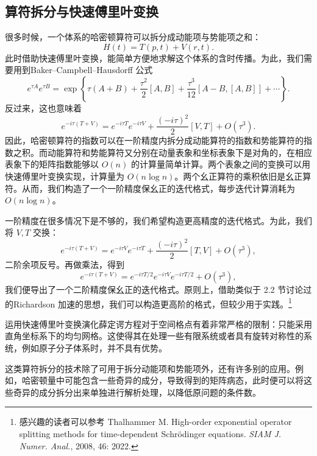 \subsection{算符拆分与快速傅里叶变换}

很多时候，一个体系的哈密顿算符可以拆分成动能项与势能项之和：
\begin{equation}
 H(t)=T(p,t)+V(r,t).
\tag{6.2.20}
\end{equation}
此时借助快速傅里叶变换，能简单方便地求解这个体系的含时传播。为此，我们需要用到Baker--Campbell--Hausdorff 公式
\begin{equation}
 e^{\tau A}e^{\tau B}=\exp\left\{\tau(A+B)+\frac{\tau^2}{2}[A,B]+\frac{\tau^3}{12}[A-B,[A,B]]+\cdots\right\}.
\tag{6.2.21}
\end{equation}
反过来，这也意味着
\begin{equation}
 e^{-i\tau(T+V)}=e^{-i\tau T}e^{-i\tau V}+\frac{(-i\tau)^2}{2}[V,T]+O(\tau^3).
\tag{6.2.22}
\end{equation}
因此，哈密顿算符的指数可以在一阶精度内拆分成动能算符的指数和势能算符的指数之积。而动能算符和势能算符又分别在动量表象和坐标表象下是对角的，在相应表象下的矩阵指数能够以 $O(n)$ 的计算量简单计算。两个表象之间的变换可以用快速傅里叶变换实现，计算量为 $O(n\log n)$。两个幺正算符的乘积依旧是幺正算符。从而，我们构造了一个一阶精度保幺正的迭代格式，每步迭代计算消耗为 $O(n\log n)$。

一阶精度在很多情况下是不够的，我们希望构造更高精度的迭代格式。为此，我们将 $V,T$ 交换：
\begin{equation}
 e^{-i\tau(T+V)}=e^{-i\tau V}e^{-i\tau T}+\frac{(-i\tau)^2}{2}[T,V]+O(\tau^3),
\tag{6.2.23}
\end{equation}
二阶余项反号。再做乘法，得到
\begin{equation}
 e^{-i\tau(T+V)}=e^{-i\tau T/2}e^{-i\tau V}e^{-i\tau T/2}+O(\tau^3),
\tag{6.2.24}
\end{equation}
我们便导出了一个二阶精度保幺正的迭代格式。原则上，借助类似于 2.2 节讨论过的Richardson 加速的思想，我们可以构造更高阶的格式，但较少用于实践。\footnote{感兴趣的读者可以参考 Thalhammer M. High-order exponential operator splitting methods for time-dependent Schrödinger equations. \emph{SIAM J. Numer. Anal.}, 2008, 46: 2022.}

运用快速傅里叶变换演化薛定谔方程对于空间格点有着非常严格的限制：只能采用直角坐标系下的均匀网格。这使得其在处理一些有限系统或者具有旋转对称性的系统，例如原子分子体系时，并不具有优势。

这类算符拆分的技术除了可用于拆分动能项和势能项外，还有许多别的应用。例如，哈密顿量中可能包含一些奇异的成分，导致得到的矩阵病态，此时便可以将这些奇异的成分拆分出来单独进行解析处理，以降低原问题的条件数。

